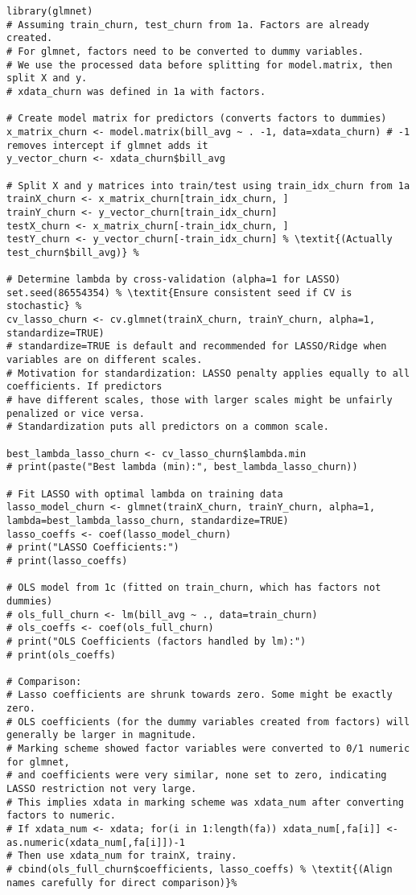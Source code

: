 \documentclass[12pt,a4paper]{article}
\begin{document}
\begin{lstlisting}
library(glmnet)
# Assuming train_churn, test_churn from 1a. Factors are already created.
# For glmnet, factors need to be converted to dummy variables.
# We use the processed data before splitting for model.matrix, then split X and y.
# xdata_churn was defined in 1a with factors.

# Create model matrix for predictors (converts factors to dummies)
x_matrix_churn <- model.matrix(bill_avg ~ . -1, data=xdata_churn) # -1 removes intercept if glmnet adds it
y_vector_churn <- xdata_churn$bill_avg

# Split X and y matrices into train/test using train_idx_churn from 1a
trainX_churn <- x_matrix_churn[train_idx_churn, ]
trainY_churn <- y_vector_churn[train_idx_churn]
testX_churn <- x_matrix_churn[-train_idx_churn, ]
testY_churn <- y_vector_churn[-train_idx_churn] % \textit{(Actually test_churn$bill_avg)} %

# Determine lambda by cross-validation (alpha=1 for LASSO)
set.seed(86554354) % \textit{Ensure consistent seed if CV is stochastic} %
cv_lasso_churn <- cv.glmnet(trainX_churn, trainY_churn, alpha=1, standardize=TRUE)
# standardize=TRUE is default and recommended for LASSO/Ridge when variables are on different scales.
# Motivation for standardization: LASSO penalty applies equally to all coefficients. If predictors
# have different scales, those with larger scales might be unfairly penalized or vice versa.
# Standardization puts all predictors on a common scale.

best_lambda_lasso_churn <- cv_lasso_churn$lambda.min
# print(paste("Best lambda (min):", best_lambda_lasso_churn))

# Fit LASSO with optimal lambda on training data
lasso_model_churn <- glmnet(trainX_churn, trainY_churn, alpha=1, lambda=best_lambda_lasso_churn, standardize=TRUE)
lasso_coeffs <- coef(lasso_model_churn)
# print("LASSO Coefficients:")
# print(lasso_coeffs)

# OLS model from 1c (fitted on train_churn, which has factors not dummies)
# ols_full_churn <- lm(bill_avg ~ ., data=train_churn)
# ols_coeffs <- coef(ols_full_churn)
# print("OLS Coefficients (factors handled by lm):")
# print(ols_coeffs)

# Comparison:
# Lasso coefficients are shrunk towards zero. Some might be exactly zero.
# OLS coefficients (for the dummy variables created from factors) will generally be larger in magnitude.
# Marking scheme showed factor variables were converted to 0/1 numeric for glmnet,
# and coefficients were very similar, none set to zero, indicating LASSO restriction not very large.
# This implies xdata in marking scheme was xdata_num after converting factors to numeric.
# If xdata_num <- xdata; for(i in 1:length(fa)) xdata_num[,fa[i]] <- as.numeric(xdata_num[,fa[i]])-1
# Then use xdata_num for trainX, trainy.
# cbind(ols_full_churn$coefficients, lasso_coeffs) % \textit{(Align names carefully for direct comparison)}%
\end{lstlisting}
\end{document}
